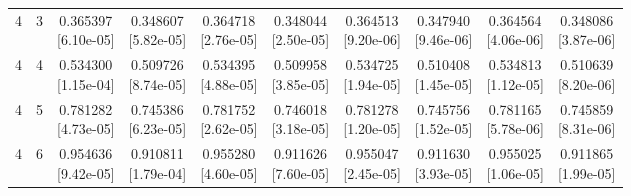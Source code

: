 \documentclass[12pt,letterpaper]{article}
\theoremstyle{plain}
\theoremstyle{definition}
\begin{document}
\begin{table}[p]
\begin{adjustbox}{max width=\linewidth}
\begin{tabular}{@{}rr*{8}{c}@{}}
4 & 3 & \shortstack{0.365397\\[-1pt]{\scriptsize[6.10e-05]}} & \shortstack{0.348607\\[-1pt]{\scriptsize[5.82e-05]}} & \shortstack{0.364718\\[-1pt]{\scriptsize[2.76e-05]}} & \shortstack{0.348044\\[-1pt]{\scriptsize[2.50e-05]}} & \shortstack{0.364513\\[-1pt]{\scriptsize[9.20e-06]}} & \shortstack{0.347940\\[-1pt]{\scriptsize[9.46e-06]}} & \shortstack{0.364564\\[-1pt]{\scriptsize[4.06e-06]}} & \shortstack{0.348086\\[-1pt]{\scriptsize[3.87e-06]}}\\
4 & 4 & \shortstack{0.534300\\[-1pt]{\scriptsize[1.15e-04]}} & \shortstack{0.509726\\[-1pt]{\scriptsize[8.74e-05]}} & \shortstack{0.534395\\[-1pt]{\scriptsize[4.88e-05]}} & \shortstack{0.509958\\[-1pt]{\scriptsize[3.85e-05]}} & \shortstack{0.534725\\[-1pt]{\scriptsize[1.94e-05]}} & \shortstack{0.510408\\[-1pt]{\scriptsize[1.45e-05]}} & \shortstack{0.534813\\[-1pt]{\scriptsize[1.12e-05]}} & \shortstack{0.510639\\[-1pt]{\scriptsize[8.20e-06]}}\\
4 & 5 & \shortstack{0.781282\\[-1pt]{\scriptsize[4.73e-05]}} & \shortstack{0.745386\\[-1pt]{\scriptsize[6.23e-05]}} & \shortstack{0.781752\\[-1pt]{\scriptsize[2.62e-05]}} & \shortstack{0.746018\\[-1pt]{\scriptsize[3.18e-05]}} & \shortstack{0.781278\\[-1pt]{\scriptsize[1.20e-05]}} & \shortstack{0.745756\\[-1pt]{\scriptsize[1.52e-05]}} & \shortstack{0.781165\\[-1pt]{\scriptsize[5.78e-06]}} & \shortstack{0.745859\\[-1pt]{\scriptsize[8.31e-06]}}\\
4 & 6 & \shortstack{0.954636\\[-1pt]{\scriptsize[9.42e-05]}} & \shortstack{0.910811\\[-1pt]{\scriptsize[1.79e-04]}} & \shortstack{0.955280\\[-1pt]{\scriptsize[4.60e-05]}} & \shortstack{0.911626\\[-1pt]{\scriptsize[7.60e-05]}} & \shortstack{0.955047\\[-1pt]{\scriptsize[2.45e-05]}} & \shortstack{0.911630\\[-1pt]{\scriptsize[3.93e-05]}} & \shortstack{0.955025\\[-1pt]{\scriptsize[1.06e-05]}} & \shortstack{0.911865\\[-1pt]{\scriptsize[1.99e-05]}}\\

\end{tabular}
\end{adjustbox}
\end{table}
\end{document}
